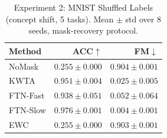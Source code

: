 \begin{table}[t]
\caption{Experiment 2: MNIST Shuffled Labels (concept shift, 5 tasks). Mean $\pm$ std over 8 seeds, mask-recovery protocol.}
\label{tab:exp2}
\vskip 0.05in
\begin{center}\begin{small}\begin{sc}
\begin{tabular}{lrr}
\toprule
Method & ACC$\uparrow$ & FM$\downarrow$ \\
\midrule
NoMask & $0.255\pm0.000$ & $0.904\pm0.001$ \\
KWTA & $0.951\pm0.004$ & $0.025\pm0.005$ \\
FTN-Fast & $0.938\pm0.051$ & $0.052\pm0.064$ \\
FTN-Slow & $0.976\pm0.001$ & $0.004\pm0.001$ \\
EWC & $0.255\pm0.000$ & $0.903\pm0.001$ \\
\bottomrule
\end{tabular}
\end{sc}\end{small}\end{center}
\vskip -0.1in
\end{table}
